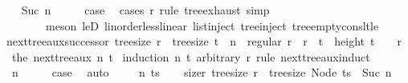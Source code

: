 \begin{isabellebody}
\isamarkupfalse%
\isanewline
\ \ \isamarkupfalse%
\ {\isacharparenleft}{\kern0pt}Suc\ n{\isacharparenright}{\kern0pt}\isanewline
\ \ \isamarkupfalse%
\ \isamarkupfalse%
\ {\isacharquery}{\kern0pt}case\ \isamarkupfalse%
\ {\isacharparenleft}{\kern0pt}cases\ r\ rule{\isacharcolon}{\kern0pt}\ tree{\isachardot}{\kern0pt}exhaust{\isacharcomma}{\kern0pt}\ simp{\isacharcomma}{\kern0pt}\isanewline
\ \ \ \ \ \ \ \ meson\ leD\ linorder{\isacharunderscore}{\kern0pt}less{\isacharunderscore}{\kern0pt}linear\ list{\isachardot}{\kern0pt}inject\ tree{\isachardot}{\kern0pt}inject\ tree{\isacharunderscore}{\kern0pt}empty{\isacharunderscore}{\kern0pt}cons{\isacharunderscore}{\kern0pt}lt{\isacharunderscore}{\kern0pt}le{\isacharparenright}{\kern0pt}\isanewline
{}\isamarkupfalse%
%
\endisatagproof
{\isafoldproof}%
%
\isadelimproof
\isanewline
%
\endisadelimproof
\isanewline
{}\isamarkupfalse%
\ next{\isacharunderscore}{\kern0pt}tree{\isacharunderscore}{\kern0pt}aux{\isacharunderscore}{\kern0pt}successor{\isacharcolon}{\kern0pt}\ {\isachardoublequoteopen}tree{\isacharunderscore}{\kern0pt}size\ r\ {\isacharequal}{\kern0pt}\ tree{\isacharunderscore}{\kern0pt}size\ t\ {\isacharplus}{\kern0pt}\ n\ {\isasymLongrightarrow}\ regular\ r\ {\isasymLongrightarrow}\ r\ {\isacharless}{\kern0pt}\ t\ {\isasymLongrightarrow}\ height\ t\ {\isasymge}\ {}\ {\isasymLongrightarrow}\ r\ {\isasymle}\ the\ {\isacharparenleft}{\kern0pt}next{\isacharunderscore}{\kern0pt}tree{\isacharunderscore}{\kern0pt}aux\ n\ t{\isacharparenright}{\kern0pt}{\isachardoublequoteclose}\isanewline
%
\isadelimproof
%
\endisadelimproof
%
\isatagproof
{}\isamarkupfalse%
\ {\isacharparenleft}{\kern0pt}induction\ n\ t\ arbitrary{\isacharcolon}{\kern0pt}\ r\ rule{\isacharcolon}{\kern0pt}\ next{\isacharunderscore}{\kern0pt}tree{\isacharunderscore}{\kern0pt}aux{\isachardot}{\kern0pt}induct{\isacharparenright}{\kern0pt}\isanewline
\ \ \isamarkupfalse%
\ {\isacharparenleft}{\kern0pt}{}\ n{\isacharparenright}{\kern0pt}\isanewline
\ \ \isamarkupfalse%
\ \isamarkupfalse%
\ {\isacharquery}{\kern0pt}case\ \isamarkupfalse%
\ auto\isanewline
{}\isamarkupfalse%
\isanewline
\ \ \isamarkupfalse%
\ {\isacharparenleft}{\kern0pt}{}\ n\ ts{\isacharparenright}{\kern0pt}\isanewline
\ \ \isamarkupfalse%
\ size{\isacharunderscore}{\kern0pt}r{\isacharcolon}{\kern0pt}\ {\isachardoublequoteopen}tree{\isacharunderscore}{\kern0pt}size\ r\ {\isasymle}\ tree{\isacharunderscore}{\kern0pt}size\ {\isacharparenleft}{\kern0pt}Node\ ts{\isacharparenright}{\kern0pt}\ {\isacharplus}{\kern0pt}\ Suc\ n{\isachardoublequoteclose}\ \isamarkupfalse%

\end{isabellebody}
